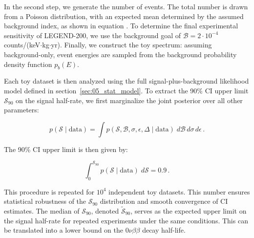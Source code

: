 In the second step, we generate the number of events. The total number is drawn from a Poisson distribution, with an expected mean determined by the assumed background index, as shown in equation . To determine the final experimental sensitivity of LEGEND-200, we use the background goal of $\mathcal{B} = 2 \cdot 10^{-4}$ counts/(keV$\cdot$kg$\cdot$yr). 
Finally, we construct the toy spectrum: assuming background-only, event energies are sampled from the background probability density function $p_b(E)$. 

Each toy dataset is then analyzed using the full signal-plus-background likelihood model defined in section~\ref{sec:05_stat_model}. To extract the 90\% CI upper limit $\mathcal{S}_{90}$ on the signal half-rate, we first marginalize the joint posterior over all other parameters:

\begin{equation}
\label{eq:Bayesian_marginalization}
    p(\mathcal{S} \mid \mathrm{data}) = \int p(\mathcal{S}, \mathcal{B}, \sigma, \epsilon, \Delta \mid \mathrm{data}) \; d \mathcal{B} \, d \sigma \, d \epsilon \,.
\end{equation}

The 90\% CI upper limit is then given by:

\begin{equation}
\label{eq:Bayesian_S_90}
    \int_0^{\mathcal{S}_{90}} p\left( \mathcal{S} \mid \mathrm{data} \right) \; d\mathcal{S} = 0.9 \,.
\end{equation}



This procedure is repeated for $10^{4}$ independent toy datasets. This number ensures statistical robustness of the $\mathcal{S}_{90}$ distribution and smooth convergence of CI estimates. The median of $\mathcal{S}_{90}$, denoted $\tilde{\mathcal{S}}_{90}$, serves as the expected upper limit on the signal half-rate for repeated experiments under the same conditions. This can be translated into a lower bound on the $0 \nu \beta \beta$ decay half-life. 

